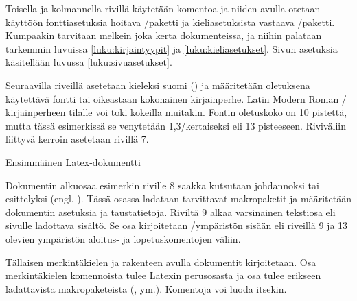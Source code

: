 Toisella ja kolmannella rivillä käytetään komentoa  ja niiden avulla otetaan käyttöön fontti\-asetuksia
hoitava \-/paketti ja kieli\-asetuksista vastaava
\-/paketti. Kumpaakin tarvitaan melkein joka kerta
dokumenteissa, ja niihin palataan tarkemmin luvuissa
\ref{luku:kirjaintyypit} ja \ref{luku:kieliasetukset}. Sivun asetuksia
käsitellään luvussa \ref{luku:sivuasetukset}.

Seuraavilla riveillä asetetaan kieleksi suomi () ja
määritetään oletuksena käytettävä fontti tai oikeastaan kokonainen
kirjainperhe. Latin Modern Roman \=/kirjainperheen tilalle voi toki
kokeilla muitakin. Fontin oletuskoko on 10 pistettä, mutta tässä
esimerkissä se venytetään 1,3\-/kertaiseksi eli 13 pisteeseen.
Riviväliin liittyvä kerroin asetetaan rivillä 7.

\begin{esimerkki*}
\caption{Ensimmäinen Latex-dokumentti}
\label{esim:ensimmainen}
\end{esimerkki*}

Dokumentin alku\-osaa esimerkin riville 8 saakka kutsutaan johdannoksi
tai esittelyksi (engl. ). Tässä osassa ladataan
tarvittavat makropaketit ja määritetään dokumentin asetuksia ja
taustatietoja. Riviltä 9 alkaa varsinainen tekstiosa eli sivulle
ladottava sisältö. Se osa kirjoitetaan \-/ympäristön
sisään eli riveillä 9 ja 13 olevien ympäristön aloi\-tus- ja
lopetuskomentojen väliin.

Tällaisen merkintäkielen ja rakenteen avulla dokumentit kirjoitetaan.
Osa merkintäkielen komennoista tulee Latexin perusosasta ja osa tulee
erikseen ladattavista makropaketeista (,
 ym.). Komentoja voi luoda itsekin.
